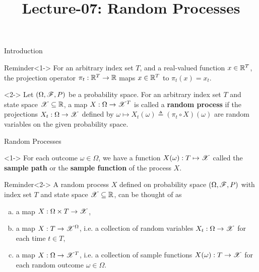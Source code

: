 \documentclass[12pt,aspectratio=169]{beamer}
\title{Lecture-07: Random Processes}
\date{}
\begin{document}
\pagestyle{empty}
\maketitle

\begin{frame}{Introduction} 
\begin{block}{Reminder}<1->
For an arbitrary index set $T$, and a real-valued function $x \in \mathbb{R}^T$, 
the projection operator $\pi_t:\mathbb{R}^T\to\mathbb{R}$ maps $x\in\mathbb{R}^T$ to $\pi_t(x) = x_t$. 
\end{block}

\begin{Definition}<2->
Let $(\Omega, \mathscr{F}, P)$ be a probability space. 
For an arbitrary index set $T$ and state space $\mathscr{X} \subseteq \mathbb{R}$, 
a map $X : \Omega \to \mathscr{X}^T$ is called a \textbf{random process} if the projections $X_t:\Omega\to\mathscr{X}$ defined by $\omega \mapsto X_t(\omega) \triangleq (\pi_t\circ X)(\omega)$ are random variables on the given probability space. 
\end{Definition}
\end{frame}

\begin{frame}{Random Processes}
\begin{Definition} <1->
For each outcome $\omega \in \Omega$, we have a function $X(\omega): T \mapsto \mathscr{X}$ called the \textbf{sample path} or the \textbf{sample function} of the process $X$. %
\end{Definition}
\begin{block}{Reminder}<2-> 
A random process $X$ defined on probability space $(\Omega, \mathscr{F}, P)$ with index set $T$ and state space $\mathscr{X}\subseteq\mathbb{R}$, can be thought of as 
\begin{enumerate}[(a)]
\item <3-> a map $X: \Omega \times T \to \mathscr{X}$, 
\item <4-> a map $X: T \to \mathscr{X}^\Omega$, i.e. a collection of random variables $X_t: \Omega \to \mathscr{X}$ for each time $t \in T$, 
\item <5-> a map $X: \Omega \to \mathscr{X}^T$, i.e. a collection of sample functions $X(\omega): T \to \mathscr{X}$ for each random outcome $\omega \in \Omega$. 
\end{enumerate}
\end{block}
\end{frame}
\end{document}
